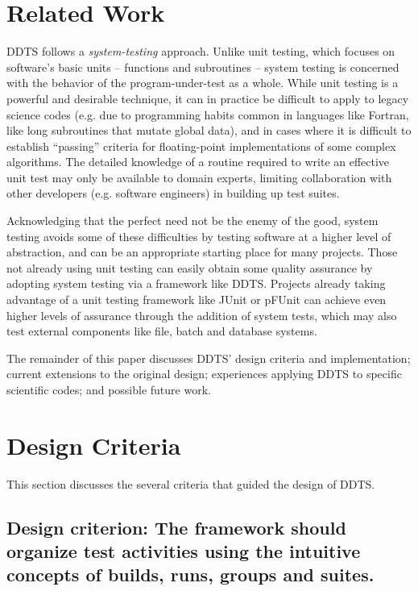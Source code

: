 \documentclass[conference]{IEEEtran}
\begin{document}
\section{Related Work}

DDTS follows a \emph{system-testing} approach. Unlike unit testing, which focuses on software's basic units -- functions and subroutines -- system testing is concerned with the behavior of the program-under-test as a whole. While unit testing is a powerful and desirable technique, it can in practice be difficult to apply to legacy science codes \cite{clune} (e.g. due to programming habits common in languages like Fortran, like long subroutines that mutate global data), and in cases where it is difficult to establish ``passing'' criteria for floating-point implementations of some complex algorithms. The detailed knowledge of a routine required to write an effective unit test may only be available to domain experts, limiting collaboration with other developers (e.g. software engineers) in building up test suites.

Acknowledging that the perfect need not be the enemy of the good, system testing avoids some of these difficulties by testing software at a higher level of abstraction, and can be an appropriate starting place for many projects. Those not already using unit testing can easily obtain some quality assurance by adopting system testing via a framework like DDTS. Projects already taking advantage of a unit testing framework like JUnit \cite{junit} or pFUnit \cite{pfunit} can achieve even higher levels of assurance through the addition of system tests, which may also test external components like file, batch and database systems.

The remainder of this paper discusses DDTS' design criteria and implementation; current extensions to the original design; experiences applying DDTS to specific scientific codes; and possible future work.

\section{Design Criteria}
This section discusses the several criteria that guided the design of DDTS.

\subsection{Design criterion: The framework should organize test activities using the intuitive concepts of builds, runs, groups and suites.}
\end{document}
